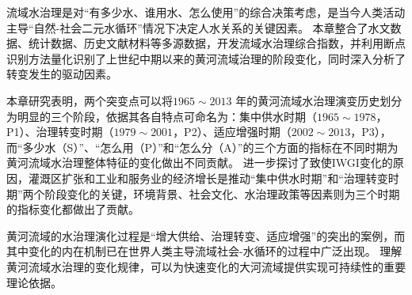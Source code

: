 流域水治理是对“有多少水、谁用水、怎么使用”的综合决策考虑，是当今人类活动主导“自然-社会二元水循环”情况下决定人水关系的关键因素。
本章整合了水文数据、统计数据、历史文献材料等多源数据，开发流域水治理综合指数，并利用断点识别方法量化识别了上世纪中期以来的黄河流域治理的阶段变化，同时深入分析了转变发生的驱动因素。

本章研究表明，两个突变点可以将$1965 \sim 2013$ 年的黄河流域水治理演变历史划分为明显的三个阶段，依据其各自特点可命名为：集中供水时期（$1965 \sim 1978$，P1）、治理转变时期（$1979 \sim 2001$，P2）、适应增强时期（$2002 \sim 2013$，P3），而“多少水（S）”、“怎么用（P）”和“怎么分（A）”的三个方面的指标在不同时期为黄河流域水治理整体特征的变化做出不同贡献。
进一步探讨了致使IWGI变化的原因，灌溉区扩张和工业和服务业的经济增长是推动“集中供水时期”和“治理转变时期”两个阶段变化的关键，环境背景、社会文化、水治理政策等因素则为三个时期的指标变化都做出了贡献。

黄河流域的水治理演化过程是“增大供给、治理转变、适应增强”的突出的案例，而其中变化的内在机制已在世界人类主导流域社会-水循环的过程中广泛出现。
理解黄河流域水治理的变化规律，可以为快速变化的大河流域提供实现可持续性的重要理论依据。
